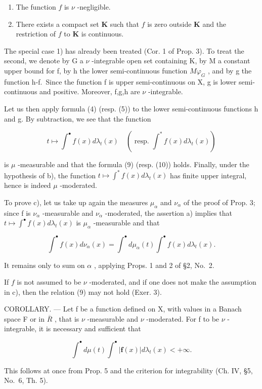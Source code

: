 \begin{enumerate}
\def\labelenumi{\arabic{enumi})}
\item
  The function \(f\) is \(\nu\) -negligible.
\item
  There exists a compact set \(\mathbf{K}\) such that \(f\) is zero outside \(\mathbf{K}\) and the restriction of \(f\) to \(\mathbf{K}\) is continuous.
\end{enumerate}

The special case 1) has already been treated (Cor. 1 of Prop. 3). To treat the second, we denote by G a \(\nu\) -integrable open set containing K, by M a constant upper bound for f, by h the lower semi-continuous function \(M\varphi_{G}\) , and by g the function h-f.~Since the function f is upper semi-continuous on X, g is lower semi-continuous and positive. Moreover, f,g,h are \(\nu\) -integrable.

Let us then apply formula (4) (resp. (5)) to the lower semi-continuous functions h and g. By subtraction, we see that the function

\[
t \mapsto \int^ {\bullet} f (x) d \lambda_ {t} (x) \quad (\text { resp. } \int^ {*} f (x) d \lambda_ {t} (x))
\]

is \(\mu\) -measurable and that the formula (9) (resp. (10)) holds. Finally, under the hypothesis of b), the function \(t \mapsto \int^{*} f(x) d\lambda_{t}(x)\) has finite upper integral, hence is indeed \(\mu\) -moderated.

To prove c), let us take up again the measures \(\mu_{\alpha}\) and \(\nu_{\alpha}\) of the proof of Prop. 3; since f is \(\nu_{\alpha}\) -measurable and \(\nu_{\alpha}\) -moderated, the assertion a) implies that \(t \mapsto \int^{\bullet} f(x) d\lambda_{t}(x)\) is \(\mu_{\alpha}\) -measurable and that

\[
\int^ {\bullet} f (x) d \nu_ {\alpha} (x) = \int^ {\bullet} d \mu_ {\alpha} (t) \int^ {\bullet} f (x) d \lambda_ {t} (x).
\]

It remains only to sum on \(\alpha\) , applying Props. 1 and 2 of §2, No.~2.

If \(f\) is not assumed to be \(\nu\) -moderated, and if one does not make the assumption in c), then the relation (9) may not hold (Exer. 3).

COROLLARY. --- Let f be a function defined on X, with values in a Banach space F or in \(\overline{R}\) , that is \(\nu\) -measurable and \(\nu\) -moderated. For f to be \(\nu\) -integrable, it is necessary and sufficient that

\[
\int^ {\bullet} d \mu (t) \int^ {\bullet} | \mathbf {f} (x) | d \lambda_ {t} (x) <   + \infty .
\]

This follows at once from Prop. 5 and the criterion for integrability (Ch. IV, §5, No.~6, Th. 5).

